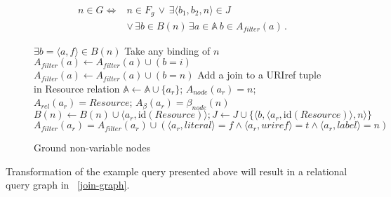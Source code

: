 \documentclass[conference,letterpaper]{IEEEtran}
\begin{document}
\begin{equation}
\begin{split}
n \in G \iff &n \in F_g
              \,\vee\, \exists \langle b_1, b_2, n \rangle \in J \\
             &\vee\, \exists b \in B(n) \, \exists a \in \mathbb{A} \:
                     b \in A_{filter}(a) \, .
\end{split}
\end{equation}

\begin{figure}
\begin{algorithmic}[1]

\State $\exists b = \langle a, f \rangle \in B(n)$
\Comment Take any binding of $n$
  \State $A_{filter}(a) \gets A_{filter}(a) \cup (b = i)$
  \State $A_{filter}(a) \gets A_{filter}(a) \cup (b = n)$
  \Comment Add a join to a URIref tuple in Resource relation
  \State $\mathbb{A} \gets \mathbb{A} \cup \{ a_r \}$;
    $A_{node}(a_r) = n$;
    $A_{rel}(a_r) = Resource$;
    $A_\beta(a_r) = \beta_{node}(n)$
  \State $B(n) \gets B(n) \cup \langle a_r, \mathrm{id}(Resource) \rangle;
    J \gets J \cup
    \{ \langle b, \langle a_r, \mathrm{id}(Resource) \rangle, n \rangle \}$
  \State $A_{filter}(a_r) = A_{filter}(a_r) \cup (
    \langle a_r, literal \rangle = f \wedge
    \langle a_r, uriref \rangle = t \wedge
    \langle a_r, label \rangle = n )$
\EndIf

\end{algorithmic}
\caption{Ground non-variable nodes}
\label{ground-non-variable-nodes}
\end{figure}

Transformation of the example query presented above will result in a
relational query graph in \figurename~\ref{join-graph}.
\end{document}
